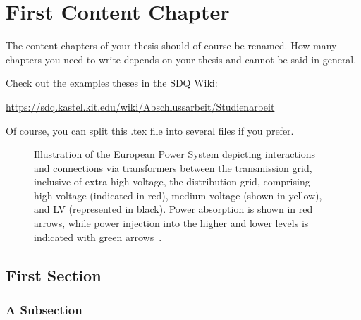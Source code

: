 
\chapter{First Content Chapter}
\label{ch:FirstContent}

The content chapters of your thesis should of course be renamed. How many
chapters you need to write depends on your thesis and cannot be said in general.

Check out the examples theses in the SDQ Wiki:

\url{https://sdq.kastel.kit.edu/wiki/Abschlussarbeit/Studienarbeit}

Of course, you can split this .tex file into several files if you prefer. 

\begin{figure}
	\centering
	\def\svgwidth{0.75\columnwidth}
	
	\caption{Illustration of the European Power System depicting interactions and connections via transformers between the transmission grid, inclusive of extra high voltage, the distribution grid, comprising high-voltage (indicated in red), medium-voltage (shown in yellow), and \gls{LV} (represented in black). Power absorption is shown in red arrows, while power injection into the higher and lower levels is indicated with green arrows~\cite{Demirel2025}.}
	\label{fig:01-eps-figEuropeanPowerSystem}
\end{figure}

\section{First Section}
\label{sec:FirstContent:FirstSection}

\Blindtext

\subsection{A Subsection}
\label{sec:FirstContent:FirstSubSection}

